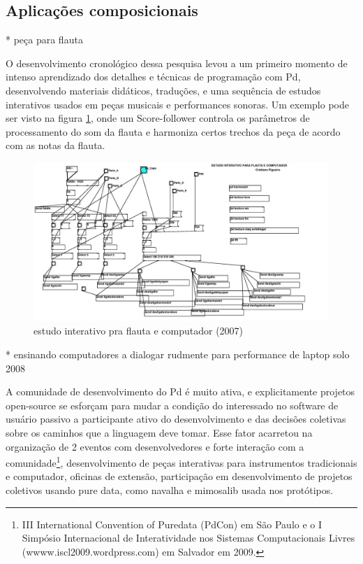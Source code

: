\documentclass{ppgmus}
\begin{document}
\subsection{Aplicações composicionais}

* peça para flauta

O desenvolvimento cronológico dessa pesquisa levou a um primeiro momento de intenso aprendizado
dos detalhes e técnicas de programação com Pd, desenvolvendo materiais didáticos, traduções, e uma
sequência de estudos interativos usados em peças musicais e performances sonoras. Um exemplo pode ser visto
na figura \ref{flauta2007}, onde um Score-follower controla os parâmetros de 
processamento do som da flauta e harmoniza certos trechos da peça de acordo com as notas da flauta.

\begin{figure}
\includegraphics[scale=.3]{flauta2007}
\caption{estudo interativo pra flauta e computador (2007)}
\label{flauta2007}
\end{figure} 

* ensinando computadores a dialogar rudmente para performance de laptop solo 2008

A comunidade de desenvolvimento do Pd é muito ativa, e explicitamente projetos open-source
se esforçam para mudar a condição do interessado no software de usuário passivo a participante ativo do desenvolvimento
e das decisões coletivas sobre os caminhos que a linguagem deve tomar. Esse  fator acarretou na
organização de 2 eventos com desenvolvedores e forte interação com a comunidade\footnote{III International
Convention of Puredata (PdCon) em São Paulo e o I Simpósio Internacional de Interatividade nos Sistemas
Computacionais Livres (wwww.iscl2009.wordpress.com) em Salvador em 2009.}, desenvolvimento de peças interativas para instrumentos
tradicionais e computador, oficinas de extensão, participação em desenvolvimento de projetos coletivos
usando pure data, como navalha e mimosalib usada nos protótipos.
\end{document}

